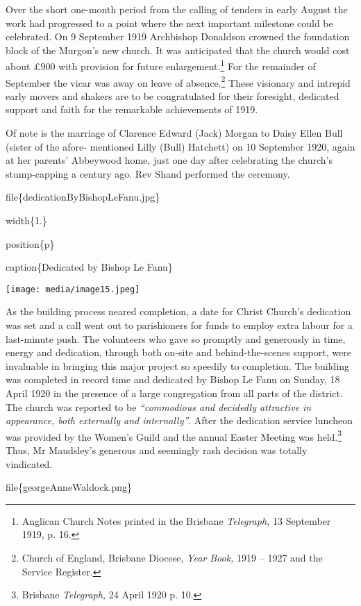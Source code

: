 Over the short one-month period from the calling of tenders in early August the work had progressed to a point where the next important milestone could be celebrated. On 9 September 1919 Archbishop Donaldson crowned the foundation block of the Murgon's new church. It was anticipated that the church would cost about £900 with provision for future enlargement.\footnote{Anglican Church Notes printed in the Brisbane \emph{Telegraph,} 13 September 1919, p. 16.} For the remainder of September the vicar was away on leave of absence.\footnote{Church of England, Brisbane Diocese, \emph{Year Book,} 1919 -- 1927 and the Service Register.} These visionary and intrepid early movers and shakers are to be congratulated for their foresight, dedicated support and faith for the remarkable achievements of 1919.

Of note is the marriage of Clarence Edward (Jack) Morgan to Daisy Ellen Bull (sister of the afore- mentioned Lilly (Bull) Hatchett) on 10 September 1920, again at her parents' Abbeywood home, just one day after celebrating the church's stump-capping a century ago. Rev Shand performed the ceremony.

file\{dedicationByBishopLeFanu.jpg\}

width\{1.\}

position\{p\}

caption\{Dedicated by Bishop Le Fanu\}

\texttt{[image: media/image15.jpeg]}

As the building process neared completion, a date for Christ Church's dedication was set and a call went out to parishioners for funds to employ extra labour for a last-minute push. The volunteers who gave so promptly and generously in time, energy and dedication, through both on-site and behind-the-scenes support, were invaluable in bringing this major project so speedily to completion. The building was completed in record time and dedicated by Bishop Le Fanu on Sunday, 18 April 1920 in the presence of a large congregation from all parts of the district. The church was reported to be \emph{``commodious and decidedly attractive in appearance, both externally and internally''}. After the dedication service luncheon was provided by the Women's Guild and the annual Easter Meeting was held.\footnote{Brisbane \emph{Telegraph,} 24 April 1920 p. 10.} Thus, Mr Maudsley's generous and seemingly rash decision was totally vindicated.

file\{georgeAnneWaldock.png\}

